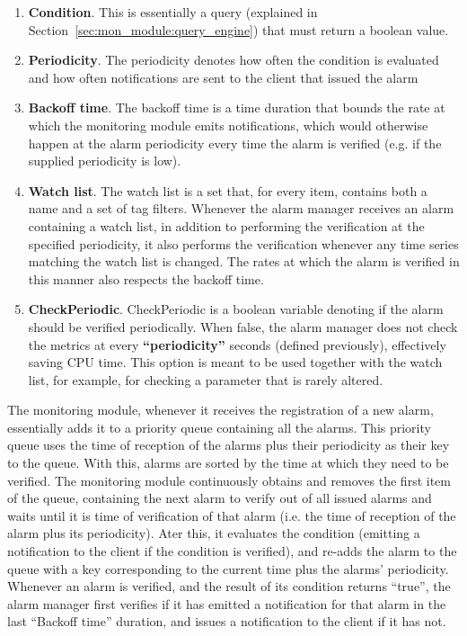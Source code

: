 \begin{enumerate}
    \item \textbf{Condition}. This is essentially a query (explained in Section~\ref{sec:mon_module:query_engine}) that must return a boolean value.
    
    \item \textbf{Periodicity}. The periodicity denotes how often the condition is evaluated and how often notifications are sent to the client that issued the alarm
    
    \item \textbf{Backoff time}. The backoff time is a time duration that bounds the rate at which the monitoring module emits notifications, which would otherwise happen at the alarm periodicity every time the alarm is verified (e.g. if the supplied periodicity is low).
    
    \item \textbf{Watch list}. The watch list is a set that, for every item, contains both a name and a set of tag filters. Whenever the alarm manager receives an alarm containing a watch list, in addition to performing the verification at the specified periodicity, it also performs the verification whenever any time series matching the watch list is changed. The rates at which the alarm is verified in this manner also respects the backoff time.
    
    \item \textbf{CheckPeriodic}. CheckPeriodic is a boolean variable denoting if the alarm should be verified periodically. When false, the alarm manager does not check the metrics at every \textbf{``periodicity''} seconds (defined previously), effectively saving CPU time. This option is meant to be used together with the watch list, for example, for checking a parameter that is rarely altered.
    
\end{enumerate}

The monitoring module, whenever it receives the registration of a new alarm, essentially adds it to a priority queue containing all the alarms. This priority queue uses the time of reception of the alarms plus their periodicity as their key to the queue. With this, alarms are sorted by the time at which they need to be verified. The monitoring module continuously obtains and removes the first item of the queue, containing the next alarm to verify out of all issued alarms and waits until it is time of verification of that alarm (i.e. the time of reception of the alarm plus its periodicity). Ater this, it evaluates the condition (emitting a notification to the client if the condition is verified), and re-adds the alarm to the queue with a key corresponding to the current time plus the alarms' periodicity. Whenever an alarm is verified, and the result of its condition returns ``true'', the alarm manager first verifies if it has emitted a notification for that alarm in the last ``Backoff time'' duration, and issues a notification to the client if it has not.
